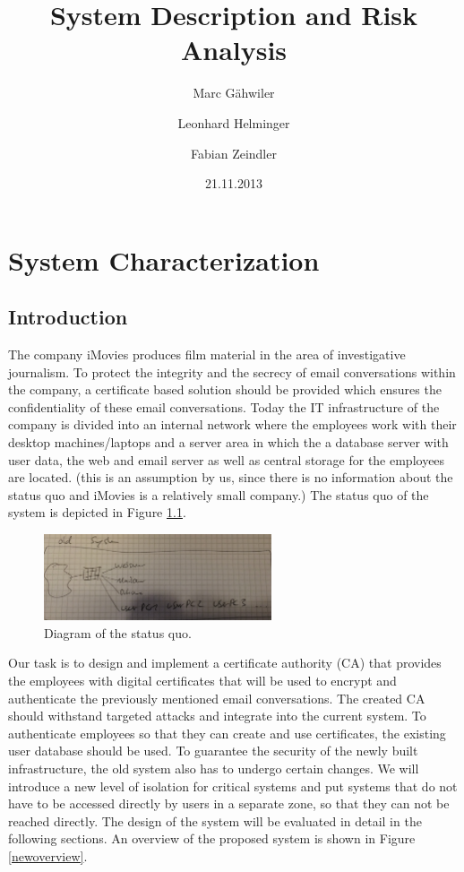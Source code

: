 \documentclass[a4paper, toc=index, 12pt, DIV14, twoside, BCOR2cm, headsepline, numbers=noenddot, bibliography=totoc]{scrbook}
\title{\huge\sffamily\bfseries System Description and Risk Analysis}
\author{Marc G\"ahwiler \and Leonhard Helminger \and Fabian Zeindler}
\date{21.11.2013}
\begin{document}
\maketitle

\tableofcontents
\pagebreak


\chapter{System Characterization}
\section{Introduction}
The company iMovies produces film material in the area of investigative journalism. To protect the integrity and the secrecy of email conversations within the company, a certificate based solution should be provided which ensures the confidentiality of these email conversations.\newline
Today the IT infrastructure of the company is divided into an internal network where the employees work with their desktop machines/laptops and a server area in which the a database server with user data, the web and email server as well as central storage for the employees are located. (this is an assumption by us, since there is no information about the status quo and iMovies is a relatively small company.) The status quo of the system is depicted in Figure \ref{oldsystem}.

\begin{figure}[H]
  \centering
    \includegraphics[width=0.6\textwidth]{images/oldsystem.jpg}  
  \caption{Diagram of the status quo.}
  \label{oldsystem}
\end{figure}

Our task is to design and implement a certificate authority (CA) that provides the employees with digital certificates that will be used to encrypt and authenticate the previously mentioned email conversations.\newline
The created CA should withstand targeted attacks and integrate into the current system. To authenticate employees so that they can create and use certificates, the existing user database should be used. To guarantee the security of the newly built infrastructure, the old system also has to undergo certain changes. We will introduce a new level of isolation for critical systems and put systems that do not have to be accessed directly by users in a separate zone, so that they can not be reached directly. The design of the system will be evaluated in detail in the following sections. An overview of the proposed system is shown in Figure \ref{newoverview}.
\end{document}
